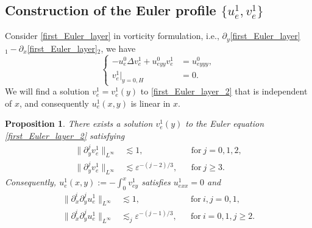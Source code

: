 \documentclass[reqno, 11pt]{amsart}
\theoremstyle{plain}
\newtheorem{proposition}[theorem]{Proposition}
\theoremstyle{definition}
\theoremstyle{remark}
\numberwithin{equation}{section}
\begin{document}
\subsection{Construction of the Euler profile $\{u_e^1, v_e^1\}$} Consider \eqref{first_Euler_layer} in vorticity formulation, i.e., $\partial_y$\eqref{first_Euler_layer}$_1 - \partial_x$\eqref{first_Euler_layer}$_2$, we have
\begin{equation}\label{first_Euler_layer_2}
\left\{\begin{aligned}
-u_e^0 \Delta v_e^1 + u_{eyy}^0 v_e^1 &= u_{eyyy}^0,\\
v_e^1|_{y=0,H} &= 0.
\end{aligned}\right.
\end{equation}
We will find a solution $v_e^1 = v_e^1(y)$ to \eqref{first_Euler_layer_2} that is independent of $x$, and consequently $u_e^1(x,y)$ is linear in $x$.

\begin{proposition}
There exists a solution $v_e^1(y)$ to the Euler equation \eqref{first_Euler_layer_2} satisfying
\begin{equation}\label{Euler_estimate1}
\begin{aligned}
\|\partial_y^j v_e^1\|_{L^\infty} &\lesssim 1, &&\mbox{for}~j = 0,1,2,\\
\|\partial_y^j v_e^1\|_{L^\infty} &\lesssim \varepsilon^{-(j-2)/3}, && \mbox{for}~j \ge 3.
\end{aligned}
\end{equation}
Consequently, $u_e^1(x,y):= -\int_0^x v_{ey}^1$ satisfies $u_{exx}^1 = 0$ and
\begin{equation}\label{Euler_estimate2}
\begin{aligned}
\|\partial_x^i \partial_y^j u_e^1\|_{L^\infty} &\lesssim 1, &&\mbox{for}~i,j = 0,1,\\
\|\partial_x^i \partial_y^j u_e^1\|_{L^\infty} &\lesssim_j \varepsilon^{-(j-1)/3}, && \mbox{for}~i =0,1, j \ge 2.
\end{aligned}
\end{equation}
\end{proposition}
\end{document}
